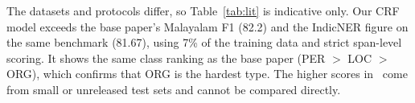 The datasets and protocols differ, so Table~\ref{tab:lit} is indicative
only. Our CRF model exceeds the base paper's Malayalam F1 (82.2) and the
IndicNER figure on the same benchmark (81.67), using 7\% of the training data
and strict span-level scoring. It shows the same class ranking as the base
paper (PER $>$ LOC $>$ ORG), which confirms that ORG is the hardest type.
The higher scores in~\cite{lakshmi2016fuzzy, gopalakrishnan2025efficient}
come from small or unreleased test sets and cannot be compared directly.
